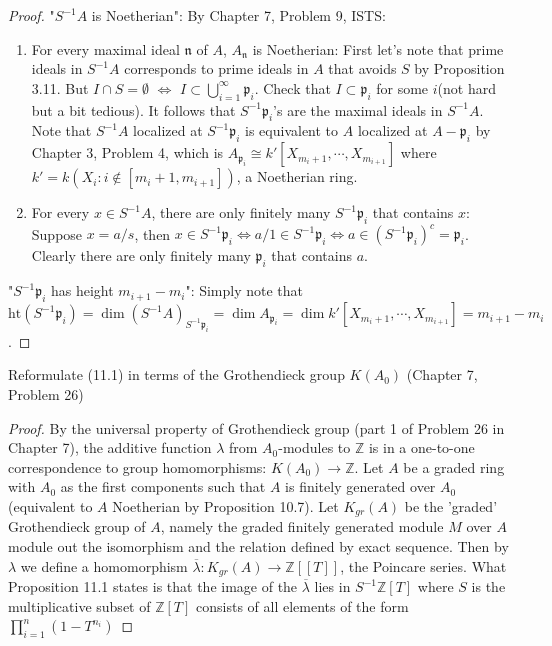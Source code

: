 \documentclass{solution}
\begin{document}
\begin{proof}
    "$S ^{-1} A$ is Noetherian": By Chapter 7, Problem 9, ISTS:
    \begin{enumerate}
        \item For every maximal ideal $\mathfrak{n}$ of $A$, $A_{\mathfrak{n}}$ is Noetherian: First let's note that prime ideals in $S ^{-1} A$ corresponds to prime ideals in $A$ that avoids $S$ by Proposition 3.11. But $I \cap S = \emptyset$ $\Leftrightarrow$ $I \subset \bigcup\limits_{i = 1}^{\infty} \mathfrak{p}_i$. Check that $I \subset \mathfrak{p}_i$ for some $i$(not hard but a bit tedious). It follows that $S ^{-1} \mathfrak{p}_i$'s are the maximal ideals in $S ^{-1} A$. Note that $S ^{-1} A$ localized at $S ^{-1} \mathfrak{p}_i$ is equivalent to $A$ localized at $A - \mathfrak{p}_i$ by Chapter 3, Problem 4, which is $A_{\mathfrak{p}_i} \cong k'[X_{m_{i} + 1}, \cdots, X_{m_{i + 1}}]$ where $k' = k(X_i: i \notin [m_{i} + 1, m_{i + 1}])$, a Noetherian ring.
        \item For every $x \in S ^{-1} A$, there are only finitely many $S ^{-1} \mathfrak{p}_i$ that contains $x$: Suppose $x = a / s$, then $x \in S ^{-1} \mathfrak{p}_i \Leftrightarrow a / 1\in S ^{-1} \mathfrak{p}_i \Leftrightarrow a \in (S ^{-1} \mathfrak{p}_i )^c = \mathfrak{p}_i$. Clearly there are only finitely many $\mathfrak{p}_i$ that contains $a$.
    \end{enumerate}

    "$S ^{-1} \mathfrak{p}_i$ has height $m_{i + 1} - m_i$": Simply note that $\mathrm{ht} (S ^{-1} \mathfrak{p}_i) = \dim (S ^{-1} A)_{S ^{-1} \mathfrak{p}_i} = \dim A_{\mathfrak{p}_i} = \dim k'[X_{m_{i} + 1}, \cdots, X_{m_{i + 1}}] = m_{i + 1} - m_i$.
\end{proof}

\begin{problem}
    Reformulate (11.1) in terms of the Grothendieck group $K(A_0)$ (Chapter 7, Problem 26)
\end{problem}

\begin{proof}
    By the universal property of Grothendieck group (part 1 of Problem 26 in Chapter 7), the additive function $\lambda$ from $A_0$-modules to $\mathbb{Z}$ is in a one-to-one correspondence to group homomorphisms: $K(A_0) \rightarrow \mathbb{Z}$. Let $A$ be a graded ring with $A_0$ as the first components such that $A$ is finitely generated over $A_0$ (equivalent to $A$ Noetherian by Proposition 10.7). Let $K_{gr}(A)$ be the 'graded' Grothendieck group of $A$, namely the graded finitely generated module $M$ over $A$ module out the isomorphism and the relation defined by exact sequence. Then by $\lambda$ we define a homomorphism $\overline{\lambda}: K_{gr}(A) \rightarrow \mathbb{Z}[[T]]$, the Poincare series. What Proposition 11.1 states is that the image of the $\overline{\lambda}$ lies in $S ^{-1} \mathbb{Z}[T]$ where $S$ is the multiplicative subset of $\mathbb{Z}[T]$ consists of all elements of the form $\prod\limits_{i = 1}^{n} (1 - T^{n_i})$
\end{proof}
\end{document}
